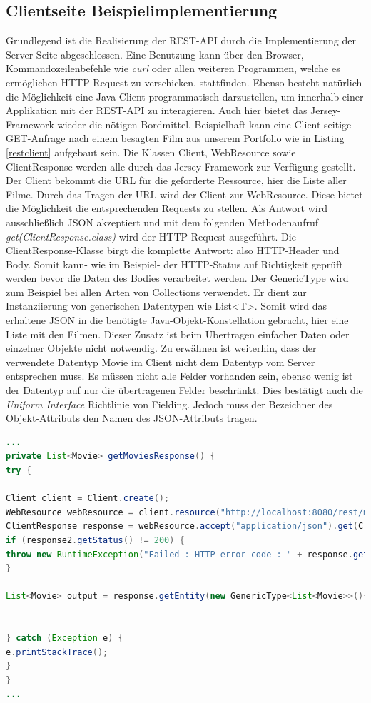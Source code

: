 \documentclass[fleqn,10.5pt,ngerman]{SelfArx}
\begin{document}
\subsection{Clientseite Beispielimplementierung}
Grundlegend ist die Realisierung der REST-API durch die Implementierung der Server-Seite abgeschlossen. Eine Benutzung kann über den Browser, Kommandozeilenbefehle wie \textit{curl} oder allen weiteren Programmen, welche es ermöglichen HTTP-Request zu verschicken, stattfinden. Ebenso besteht natürlich die Möglichkeit eine Java-Client programmatisch darzustellen, um innerhalb einer Applikation mit der REST-API zu interagieren. Auch hier bietet das Jersey-Framework wieder die nötigen Bordmittel. Beispielhaft kann eine Client-seitige GET-Anfrage nach einem besagten Film aus unserem Portfolio wie in Listing \ref{restclient} aufgebaut sein.
Die Klassen Client, WebResource sowie ClientResponse werden alle durch das Jersey-Framework zur Verfügung gestellt. Der Client bekommt die URL für die geforderte Ressource, hier die Liste aller Filme. Durch das Tragen der URL wird der Client zur WebResource. Diese bietet die Möglichkeit die entsprechenden Requests zu stellen. Als Antwort wird ausschließlich JSON akzeptiert und mit dem folgenden Methodenaufruf \textit{get(ClientResponse.class)} wird der HTTP-Request ausgeführt. Die ClientResponse-Klasse birgt die komplette Antwort: also HTTP-Header und Body. Somit kann- wie im Beispiel- der HTTP-Status auf Richtigkeit geprüft werden bevor die Daten des Bodies verarbeitet werden. Der GenericType wird zum Beispiel bei allen Arten von Collections verwendet. Er dient zur Instanziierung von generischen Datentypen wie List<T>. Somit wird das erhaltene JSON in die benötigte Java-Objekt-Konstellation gebracht, hier eine Liste mit den Filmen. Dieser Zusatz ist beim Übertragen einfacher Daten oder einzelner Objekte nicht notwendig. Zu erwähnen ist weiterhin, dass der verwendete Datentyp Movie im Client nicht dem Datentyp vom Server entsprechen muss. Es müssen nicht alle Felder vorhanden sein, ebenso wenig ist der Datentyp auf nur die übertragenen Felder beschränkt. Dies bestätigt auch die \textit{Uniform Interface} Richtlinie von Fielding. Jedoch muss der Bezeichner des Objekt-Attributs den Namen des JSON-Attributs tragen.
\begin{lstlisting}[caption=Beispiel: Beispielhafte Java-Client Anfrage, label=restclient, language=java, emptylines=0, flexiblecolumns=false]
...
private List<Movie> getMoviesResponse() {
try {

Client client = Client.create();
WebResource webResource = client.resource("http://localhost:8080/rest/movies");
ClientResponse response = webResource.accept("application/json").get(ClientResponse.class);
if (response2.getStatus() != 200) {
throw new RuntimeException("Failed : HTTP error code : " + response.getStatus());
}

List<Movie> output = response.getEntity(new GenericType<List<Movie>>(){});


} catch (Exception e) {
e.printStackTrace();
}
}
...
\end{lstlisting}
\end{document}

